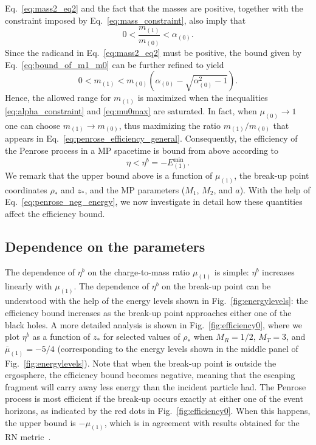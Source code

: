 Eq.~\eqref{eq:mass2_eq2} and the fact that the masses are positive, together with the constraint imposed by Eq.~\eqref{eq:mass_constraint}, also imply that
\begin{equation}\label{eq:bound_of_m1_m0}
    0 < \frac{m_{(1)}}{m_{(0)}} < \alpha_{(0)} .
\end{equation}
Since the radicand in Eq.~\eqref{eq:mass2_eq2} must be positive, the bound given by Eq.~\eqref{eq:bound_of_m1_m0} can be further refined to yield
\begin{equation} \label{eq:m1_max}
    0 < m_{(1)} < m_{(0)} \left( \alpha_{(0)} - \sqrt{\alpha_{(0)}^2 - 1} \right).
\end{equation}
Hence, the allowed range for $m_{(1)}$ is maximized when the inequalities \eqref{eq:alpha_constraint} and \eqref{eq:mu0max} are saturated. In fact, when $\mu_{(0)} \rightarrow 1$ one can choose $m_{(1)}\rightarrow m_{(0)}$, thus maximizing the ratio $m_{(1)}/m_{(0)}$ that appears in Eq.~\eqref{eq:penrose_efficiency_general}. Consequently, the efficiency of the Penrose process in a MP spacetime is bound from above according to
\begin{equation} \label{eq:eta_max_theory}
    \eta < \eta ^{b}  = -E_{(1)}^{\mathrm {min}}.
\end{equation}
%
We remark that the upper bound above is a function of $\mu_{(1)}$, the break-up point coordinates $\rho_*$ and $z_*$, and the MP parameters ($M_1$, $M_2$, and $a$). With the help of Eq.~\eqref{eq:penrose_neg_energy}, we now investigate in detail how these quantities affect the efficiency bound.

\subsection{Dependence on the parameters}

The dependence of $\eta^{b}$ on the charge-to-mass ratio $\mu_{(1)}$ is simple: $\eta^{b}$ increases linearly with $\mu_{(1)}$. The dependence of $\eta^{b}$ on the break-up point can be understood with the help of the energy levels shown in Fig.~\ref{fig:energylevels}: the efficiency bound increases as the break-up point approaches either one of the black holes. A more detailed analysis is shown in Fig.~\ref{fig:efficiency0}, where we plot $\eta^{b}$ as a function of $z_*$ for selected values of $\rho_*$ when $M_R=1/2$, $M_T=3$, and $\overline \mu_{(1)} = -5/4$ (corresponding to the energy levels shown in the middle panel of Fig.~\ref{fig:energylevels}). Note that when the break-up point is outside the ergosphere, the efficiency bound becomes negative, meaning that the escaping fragment will carry away less energy than the incident particle had. The Penrose process is most efficient if the break-up occurs exactly at either one of the event horizons, as indicated by the red dots in Fig.~\ref{fig:efficiency0}. When this happens, the upper bound is $-\mu_{(1)}$, which is in agreement with results obtained for the RN metric~\cite{bhat1985energetics,parthasarathy1986high}.

